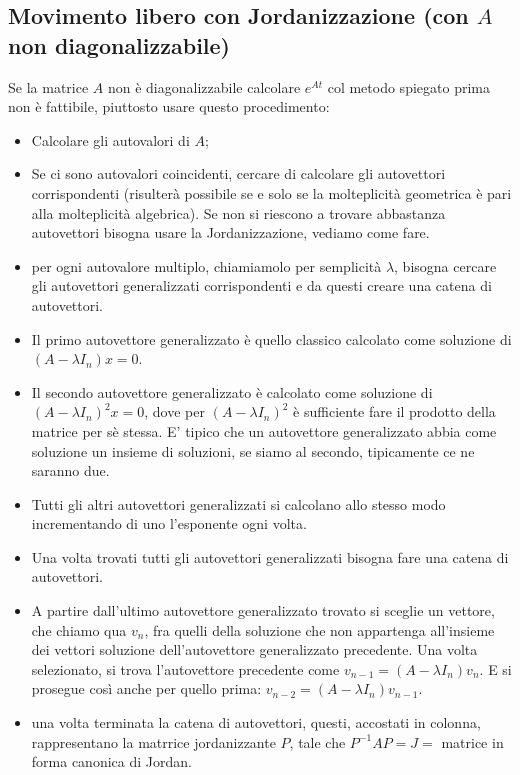 \begin{landscape}
\begin{multicols*}{3}
    \subsection{Movimento libero con Jordanizzazione (con $A$ non diagonalizzabile)}
    Se la matrice $A$ non è diagonalizzabile calcolare $e^{At}$ col metodo spiegato prima non è fattibile, piuttosto usare questo procedimento:
    \begin{itemize}
        \item Calcolare gli autovalori di $A$;
        \item Se ci sono autovalori coincidenti, cercare di calcolare gli autovettori corrispondenti (risulterà possibile se e solo se la molteplicità geometrica è pari alla molteplicità algebrica). Se non si riescono a trovare abbastanza autovettori bisogna usare la Jordanizzazione, vediamo come fare.
        \item per ogni autovalore multiplo, chiamiamolo per semplicità $\lambda$, bisogna cercare gli autovettori generalizzati corrispondenti e da questi creare una catena di autovettori.
        \item Il primo autovettore generalizzato è quello classico calcolato come soluzione di $(A-\lambda I_n) x = 0$.
        \item Il secondo autovettore generalizzato è calcolato come soluzione di $(A-\lambda I_n)^2 x = 0$, dove per $(A-\lambda I_n)^2$ è sufficiente fare il prodotto della matrice per sè stessa. E' tipico che un autovettore generalizzato abbia come soluzione un insieme di soluzioni, se siamo al secondo, tipicamente ce ne saranno due.
        \item Tutti gli altri autovettori generalizzati si calcolano allo stesso modo incrementando di uno l'esponente ogni volta.
        \item Una volta trovati tutti gli autovettori generalizzati bisogna fare una catena di autovettori.
        \item A partire dall'ultimo autovettore generalizzato trovato si sceglie un vettore, che chiamo qua $v_n$, fra quelli della soluzione che non appartenga all'insieme dei vettori soluzione dell'autovettore generalizzato precedente. Una volta selezionato, si trova l'autovettore precedente come $v_{n-1} = (A- \lambda I_n)v_n$. E si prosegue così anche per quello prima: $v_{n-2} = (A-\lambda I_n) v_{n-1}$.
        \item una volta terminata la catena di autovettori, questi, accostati in colonna, rappresentano la matrrice jordanizzante $P$, tale che $P^{-1} A P = J =$ matrice in forma canonica di Jordan.

\end{itemize}
\end{multicols*}
\end{landscape}
